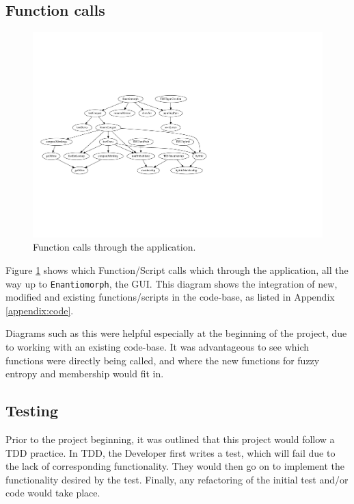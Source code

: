 \subsection{Function calls}

\begin{figure}[H]
  \centering
  \includegraphics[width=\textwidth,clip,trim=0mm 50mm 110mm 50mm]{Chapter2/software-img/function_call_1.pdf}
  \caption{Function calls through the application.}
  \label{fig:data-flow}
\end{figure}

Figure \ref{fig:data-flow} shows which Function/Script calls which through the application, all the way up to \texttt{Enantiomorph}, the \acrshort{GUI}. This diagram shows the integration of new, modified and existing functions/scripts in the code-base, as listed in Appendix \ref{appendix:code}.

Diagrams such as this were helpful especially at the beginning of the project, due to working with an existing code-base. It was advantageous to see which functions were directly being called, and where the new functions for fuzzy entropy and membership would fit in.

\subsection{Testing}

Prior to the project beginning, it was outlined that this project would follow a \acrfull{TDD} practice. In \acrshort{TDD}, the Developer first writes a test, which will fail due to the lack of corresponding functionality. They would then go on to implement the functionality desired by the test. Finally, any refactoring of the initial test and/or code would take place.

